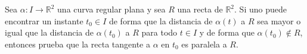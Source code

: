 \begin{ejercicio}
    Sea $\alpha:I\to \mathbb{R}^2$ una curva regular plana y sea $R$ una recta de $\mathbb{R}^2$. Si uno puede encontrar un instante $t_0\in I$ de forma que la distancia de $\alpha(t)$ a $R$ sea mayor o igual que la distancia de $\alpha(t_0)$ a $R$ para todo $t\in I$ y de forma que $\alpha(t_0)\notin R$, entonces prueba que la recta tangente a $\alpha$ en $t_0$ es paralela a $R$.\\

\end{ejercicio}
